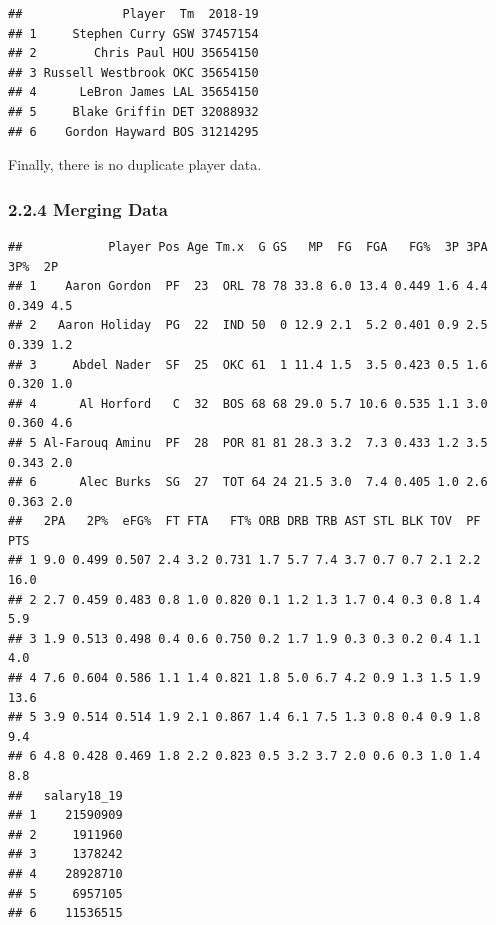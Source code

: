\documentclass[]{article}
\begin{document}
\begin{verbatim}
##              Player  Tm  2018-19
## 1     Stephen Curry GSW 37457154
## 2        Chris Paul HOU 35654150
## 3 Russell Westbrook OKC 35654150
## 4      LeBron James LAL 35654150
## 5     Blake Griffin DET 32088932
## 6    Gordon Hayward BOS 31214295
\end{verbatim}

Finally, there is no duplicate player data.

\subsubsection{2.2.4 Merging Data}\label{merging-data}

\begin{verbatim}
##            Player Pos Age Tm.x  G GS   MP  FG  FGA   FG%  3P 3PA   3P%  2P
## 1    Aaron Gordon  PF  23  ORL 78 78 33.8 6.0 13.4 0.449 1.6 4.4 0.349 4.5
## 2   Aaron Holiday  PG  22  IND 50  0 12.9 2.1  5.2 0.401 0.9 2.5 0.339 1.2
## 3     Abdel Nader  SF  25  OKC 61  1 11.4 1.5  3.5 0.423 0.5 1.6 0.320 1.0
## 4      Al Horford   C  32  BOS 68 68 29.0 5.7 10.6 0.535 1.1 3.0 0.360 4.6
## 5 Al-Farouq Aminu  PF  28  POR 81 81 28.3 3.2  7.3 0.433 1.2 3.5 0.343 2.0
## 6      Alec Burks  SG  27  TOT 64 24 21.5 3.0  7.4 0.405 1.0 2.6 0.363 2.0
##   2PA   2P%  eFG%  FT FTA   FT% ORB DRB TRB AST STL BLK TOV  PF  PTS
## 1 9.0 0.499 0.507 2.4 3.2 0.731 1.7 5.7 7.4 3.7 0.7 0.7 2.1 2.2 16.0
## 2 2.7 0.459 0.483 0.8 1.0 0.820 0.1 1.2 1.3 1.7 0.4 0.3 0.8 1.4  5.9
## 3 1.9 0.513 0.498 0.4 0.6 0.750 0.2 1.7 1.9 0.3 0.3 0.2 0.4 1.1  4.0
## 4 7.6 0.604 0.586 1.1 1.4 0.821 1.8 5.0 6.7 4.2 0.9 1.3 1.5 1.9 13.6
## 5 3.9 0.514 0.514 1.9 2.1 0.867 1.4 6.1 7.5 1.3 0.8 0.4 0.9 1.8  9.4
## 6 4.8 0.428 0.469 1.8 2.2 0.823 0.5 3.2 3.7 2.0 0.6 0.3 1.0 1.4  8.8
##   salary18_19
## 1    21590909
## 2     1911960
## 3     1378242
## 4    28928710
## 5     6957105
## 6    11536515
\end{verbatim}
\end{document}
